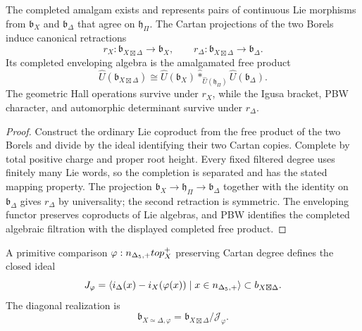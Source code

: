 \begin{theorem}
The completed amalgam exists and represents pairs of continuous Lie morphisms from $\mathfrak b_X$ and $\mathfrak b_\Delta$ that agree on $\mathfrak h_\Pi$.  The Cartan projections of the two Borels induce canonical retractions
\[
 r_X:\mathfrak b_{X\boxtimes\Delta}\longrightarrow\mathfrak b_X,
 \qquad
 r_\Delta:\mathfrak b_{X\boxtimes\Delta}\longrightarrow\mathfrak b_\Delta.
\]
Its completed enveloping algebra is the amalgamated free product
\[
 \widehat U(\mathfrak b_{X\boxtimes\Delta})
 \cong
 \widehat U(\mathfrak b_X)
 \widehat *_{\widehat U(\mathfrak h_\Pi)}
 \widehat U(\mathfrak b_\Delta).
\]
The geometric Hall operations survive under $r_X$, while the Igusa bracket, PBW character, and automorphic determinant survive under $r_\Delta$.
\end{theorem}
\begin{proof}
Construct the ordinary Lie coproduct from the free product of the two Borels and divide by the ideal identifying their two Cartan copies.  Complete by total positive charge and proper root height.  Every fixed filtered degree uses finitely many Lie words, so the completion is separated and has the stated mapping property.  The projection $\mathfrak b_X\to\mathfrak h_\Pi\to\mathfrak b_\Delta$ together with the identity on $\mathfrak b_\Delta$ gives $r_\Delta$ by universality; the second retraction is symmetric.  The enveloping functor preserves coproducts of Lie algebras, and PBW identifies the completed algebraic filtration with the displayed completed free product.
\end{proof}

\begin{definition}
A primitive comparison $\varphi:{n_{\Delta_5,+}}top_X^+$ preserving Cartan degree defines the closed ideal
\[
 J_\varphi
 =\langle 
   i_\Delta(x)-i_X(\varphi(x))\mid x\in{n_{\Delta_5,+}}
 \rangle
 \subset b_{X\boxtimes\Delta}.
\]
The diagonal realization is
\[
 \mathfrak b_{X\simeq\Delta,\varphi}
 =\mathfrak b_{X\boxtimes\Delta}/\mathcal J_\varphi.
\]
\end{definition}

